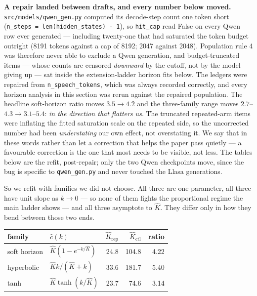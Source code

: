 \documentclass[11pt]{article}
\begin{document}
\noindent\textbf{A repair landed between drafts, and every number below moved.}
\texttt{src/models/qwen\_gen.py} computed its decode-step count one token short
(\texttt{n\_steps = len(hidden\_states) - 1}), so \texttt{hit\_cap} read False on
every Qwen row ever generated --- including twenty-one that had saturated the
token budget outright (8191 tokens against a cap of 8192; 2047 against 2048).
Population rule 4 was therefore never able to exclude a Qwen generation, and
budget-truncated items --- whose counts are censored \emph{downward} by the
cutoff, not by the model giving up --- sat inside the extension-ladder horizon
fits below. The ledgers were repaired from \texttt{n\_speech\_tokens}, which was
always recorded correctly, and every horizon analysis in this section was rerun
against the repaired population. The headline soft-horizon ratio moves
$3.5\to4.2$ and the three-family range moves $2.7$--$4.3\to3.1$--$5.4$:
\emph{in the direction that flatters us}. The truncated repeated-arm items were
inflating the fitted saturation scale on the repeated side, so the uncorrected
number had been \emph{understating} our own effect, not overstating it. We say
that in these words rather than let a correction that helps the paper pass
quietly --- a favourable correction is the one that most needs to be visible, not
less. The tables below are the refit, post-repair; only the two Qwen checkpoints
move, since the bug is specific to \texttt{qwen\_gen.py} and never touched the
Llasa generations.

So we refit with families we did not choose. All three are one-parameter, all
three have unit slope as $k\to0$ --- so none of them fights the proportional
regime the main ladder shows --- and all three asymptote to $\hat K$. They differ
only in how they bend between those two ends.

\begin{center}
\begin{tabular}{llrrr}
\toprule
family & $\hat c(k)$ & $\hat K_{\mathrm{rep}}$ & $\hat K_{\mathrm{ctl}}$ & ratio \\
\midrule
soft horizon & $\hat K(1-e^{-k/\hat K})$ & 24.8 & 104.8 & 4.22 \\
hyperbolic   & $\hat K k/(\hat K+k)$     & 33.6 & 181.7 & 5.40 \\
tanh         & $\hat K\tanh(k/\hat K)$   & 23.7 &  74.6 & 3.14 \\
\bottomrule
\end{tabular}
\end{center}
\end{document}
